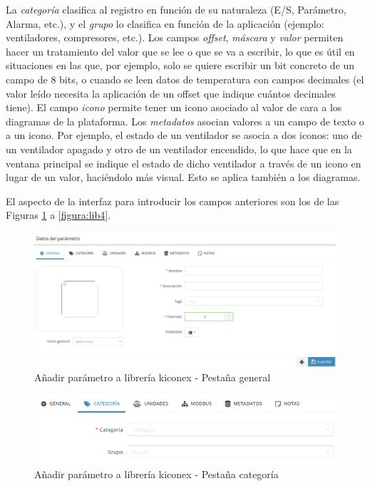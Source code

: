La \textit{categoría} clasifica al registro en función de su naturaleza (E/S, Parámetro, Alarma, etc.), y el \textit{grupo} lo clasifica en función de la aplicación (ejemplo: ventiladores, compresores, etc.). Los campos \textit{offset}, \textit{máscara} y \textit{valor} permiten hacer un tratamiento del valor que se lee o que se va a escribir, lo que es útil en situaciones en las que, por ejemplo, solo se quiere escribir un bit concreto de un campo de 8 bits, o cuando se leen datos de temperatura con campos decimales (el valor leído necesita la aplicación de un offset que indique cuántos decimales tiene).
El campo \textit{icono} permite tener un icono asociado al valor de cara a los diagramas de la plataforma.
Los \textit{metadatos} asocian valores a un campo de texto o a un icono. Por ejemplo, el estado de un ventilador se asocia a dos iconos: uno de un ventilador apagado y otro de un ventilador encendido, lo que hace que en la ventana principal se indique el estado de dicho ventilador a través de un icono en lugar de un valor, haciéndolo más visual. Esto se aplica también a los diagramas. 

\hspace{1em}

El aspecto de la interfaz  para introducir los campos anteriores son los de las Figuras \hyperref[figura:lib0]{\ref{figura:lib0}} a \hyperref[figura:lib4]{\ref{figura:lib4}}.

\begin{figure}[H]
  \centering
  \includegraphics[width=\textwidth, keepaspectratio]{img/lib0}
  \caption{Añadir parámetro a librería kiconex - Pestaña general}
  \label{figura:lib0}
\end{figure}

\begin{figure}[H]
  \centering
  \includegraphics[width=\textwidth, keepaspectratio]{img/lib1}
  \caption{Añadir parámetro a librería kiconex - Pestaña categoría}
  \label{figura:lib1}
\end{figure}

